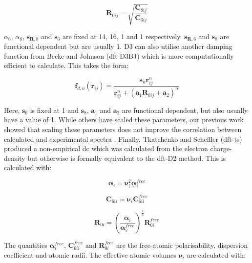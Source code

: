 \begin{equation}
\boldsymbol{R}_{0ij} = \sqrt{\frac{\boldsymbol{C}_{8ij}}{\boldsymbol{C}_{6ij}}}
\end{equation}

\({\alpha}_{6}\), \({\alpha}_{8}\), \(\boldsymbol{s}_{\boldsymbol{R},8}\) and \(\boldsymbol{s}_6\) are fixed at 14, 16, 1 and 1 respectively. \(\boldsymbol{s}_{\boldsymbol{R},6}\) and \(\boldsymbol{s}_8\) are functional dependent but are usually 1. D3 can also utilise another damping function from Becke and Johnson\cite{Becke2005} (\acrshort{dft}\nobreakdash-D3BJ) which is more computationally efficient to calculate. This takes the form:

\begin{equation}
\boldsymbol{f}_{d,n}(\boldsymbol{r}_{ij}) = \frac{\boldsymbol{s}_n \boldsymbol{r}_{ij}^n} {\boldsymbol{r}_{ij}^n + (\boldsymbol{a}_1 \boldsymbol{R}_{0ij} + \boldsymbol{a}_2)^n}
\end{equation}

Here, \(\boldsymbol{s}_6\) is fixed at 1 and \(\boldsymbol{s}_8\), \(\boldsymbol{a}_1\) and \(\boldsymbol{a}_2\) are functional dependent, but also usually have a value of 1. While others have scaled these parameters, our previous work showed that scaling these parameters does not improve the correlation between calculated and experimental spectra \cite{Kendrick2020}.  Finally, Tkatchenko and Scheffler \cite{Tkatchenko2009} (\acrshort{dft}-\acrshort{ts}) produced a non-empirical \acrshort{dc} which was calculated from the electron charge-density but otherwise is formally equivalent to the \acrshort{dft}\nobreakdash-D2 method. This is calculated with:

\begin{equation}
\boldsymbol{\alpha}_i = \boldsymbol{\nu}_i^2 \boldsymbol{\alpha}_i^{free}
\end{equation}

\begin{equation}
\boldsymbol{C}_{6ii} = \boldsymbol{\nu}_i \boldsymbol{C}_{6ii}^{free}
\end{equation}

\begin{equation}
\boldsymbol{R}_{0i} = \left(\frac{\boldsymbol{\alpha}_i}{\boldsymbol{\alpha}_i^{free}}\right)^{\frac{1}{3}} \boldsymbol{R}_{0i}^{free}
\end{equation}

The quantities \( \boldsymbol{\alpha}_i^{free} \), \( \boldsymbol{C}_{6ii}^{free} \) and \( \boldsymbol{R}_{0i}^{free} \) are the free-atomic polarisability, dispersion coefficient and atomic radii. The effective atomic volumes \( \boldsymbol{\nu}_i \) are calculated with:

